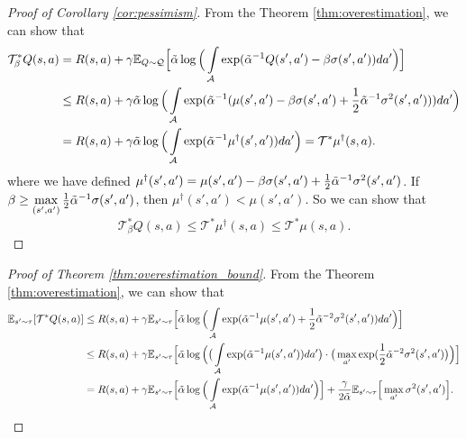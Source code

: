\documentclass{article}
\begin{document}
\begin{appendices}
	\begin{proof}[Proof of Corollary \ref{cor:pessimism}]
		From the Theorem \ref{thm:overestimation}, we can show that 
		\begin{align*}
			\mathcal{T}_{\beta}^{*} Q(s,a) 
			&= R(s,a) + \gamma \mathbb{E}_{Q\sim \mathcal{Q}} \Big[ \Tilde{\alpha} \log \Big( \int\limits_{\mathcal{A}} \exp({\Tilde{\alpha}}^{-1} Q(s',a') - \beta\sigma(s',a')) da' \Big) \Big] \\
			&\leq R(s,a) + \gamma \Tilde{\alpha} \log \Big( \int\limits_{\mathcal{A}} \exp( {\Tilde{\alpha}}^{-1} (\mu(s',a') - \beta \sigma(s',a') + \frac{1}{2} {\Tilde{\alpha}}^{-1} \sigma^2(s',a')) ) da' \Big) \\
			&=  R(s,a) + \gamma \Tilde{\alpha} \log \Big( \int\limits_{\mathcal{A}} \exp( {\Tilde{\alpha}}^{-1} \mu^{\dagger}(s',a')) da' \Big) = \mathcal{T}^{*} \mu^{\dagger}(s,a). 
		\end{align*}
		where we have defined $\mu^{\dagger}(s',a') = \mu(s',a') - \beta \sigma(s',a') + \frac{1}{2} {\Tilde{\alpha}}^{-1} \sigma^2(s',a') $. If $\beta \geq \max\limits_{(s', a')} \frac{1}{2}{\Tilde{\alpha}}^{-1} \sigma(s', a')$, then $\mu^{\dagger}(s',a') < \mu(s',a')$. So we can show that
		\begin{equation}
			\mathcal{T}_{\beta}^{*} Q(s,a) \leq \mathcal{T}^{*} \mu^{\dagger}(s,a) \leq \mathcal{T}^{*} \mu(s,a).  
		\end{equation}
	\end{proof}
	
	\begin{proof}[Proof of Theorem \ref{thm:overestimation_bound}]
		From the Theorem \ref{thm:overestimation}, we can show that
		\begin{align*}
			\mathbb{E}_{s'\sim\tau} [ \mathcal{T}^{*} Q(s,a) ] &\leq R(s,a) + \gamma \mathbb{E}_{s'\sim\tau } \Big[ \Tilde{\alpha} \log \Big( \int\limits_{\mathcal{A}} \exp( {\Tilde{\alpha}}^{-1} \mu(s',a') + \frac{1}{2} {\Tilde{\alpha}}^{-2} \sigma^2(s',a') ) da' \Big) \Big] \\
			&\leq R(s,a) + \gamma \mathbb{E}_{s'\sim\tau } \Big[ \Tilde{\alpha} \log \Big( \big( \int\limits_{\mathcal{A}} \exp( {\Tilde{\alpha}}^{-1} \mu(s',a') ) da' \big) \cdot \big( \max_{a'} \exp( \frac{1}{2} {\Tilde{\alpha}}^{-2} \sigma^2(s',a') \big) \Big) \Big] \\  
			&= R(s,a) + \gamma \mathbb{E}_{s'\sim\tau } \Big[ \Tilde{\alpha} \log \Big( \int\limits_{\mathcal{A}} \exp( {\Tilde{\alpha}}^{-1} \mu(s',a') ) da' \Big) \Big] + \frac{\gamma}{2\Tilde{\alpha}} \mathbb{E}_{s'\sim\tau } \Big[ \max_{a'} \sigma^2(s',a') \Big]. \\ 
		\end{align*}
		

\end{proof}
\end{appendices}
\end{document}
